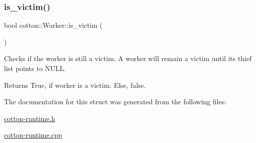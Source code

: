 \subsubsection{\texorpdfstring{is\+\_\+victim()}{is\_victim()}}
{\footnotesize\ttfamily bool cotton\+::\+Worker\+::is\+\_\+victim (\begin{DoxyParamCaption}{ }\end{DoxyParamCaption})}

Checks if the worker is still a victim. A worker will remain a victim until its thief list points to N\+U\+LL.

\begin{DoxyReturn}{Returns}
True, if worker is a victim. Else, false. 
\end{DoxyReturn}


The documentation for this struct was generated from the following files\+:\begin{DoxyCompactItemize}
\item 
\mbox{\hyperlink{cotton-runtime_8h}{cotton-\/runtime.\+h}}\item 
\mbox{\hyperlink{cotton-runtime_8cpp}{cotton-\/runtime.\+cpp}}\end{DoxyCompactItemize}
